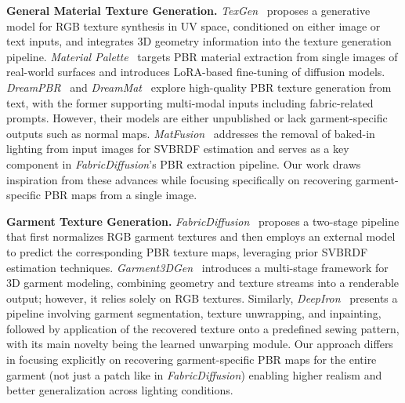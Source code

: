 \documentclass[11pt,twocolumn]{article}
\begin{document}
\textbf{General Material Texture Generation.} \textit{TexGen}~\cite{texgen} proposes a generative model for RGB texture synthesis in UV space, 
conditioned on either image or text inputs, and integrates 3D geometry information into the texture generation pipeline. 
\textit{Material Palette}~\cite{materialpalette} targets PBR material extraction from single images of 
real-world surfaces and introduces LoRA-based fine-tuning of diffusion models. 
\textit{DreamPBR}~\cite{dreampbr} and \textit{DreamMat}~\cite{dreammat} explore high-quality PBR texture generation from text, with the 
former supporting multi-modal inputs including fabric-related prompts. 
However, their models are either unpublished or lack garment-specific outputs such as normal maps. 
\textit{MatFusion}~\cite{matfusion} addresses the removal of baked-in lighting from input images for SVBRDF 
estimation and serves as a key component in \textit{FabricDiffusion}'s PBR extraction pipeline. Our work draws 
inspiration from these advances while focusing specifically on recovering garment-specific PBR maps from a single image.

\textbf{Garment Texture Generation.} \textit{FabricDiffusion}~\cite{fabricdiffusion} proposes a two-stage pipeline that first normalizes RGB garment textures 
and then employs an external model to predict the corresponding PBR texture maps, leveraging prior SVBRDF estimation techniques. 
\textit{Garment3DGen}~\cite{garment3dgen} introduces a multi-stage framework for 3D garment modeling, combining geometry and texture streams into a 
renderable output; however, it relies solely on RGB textures. Similarly, \textit{DeepIron}~\cite{deepiron} presents a pipeline involving garment segmentation, 
texture unwrapping, and inpainting, followed by application of the recovered texture onto a predefined sewing pattern, 
with its main novelty being the learned unwarping module. Our approach differs in focusing explicitly on recovering garment-specific PBR maps for the 
entire garment (not just a patch like in \textit{FabricDiffusion}) enabling higher realism and better generalization across lighting conditions.
\end{document}
